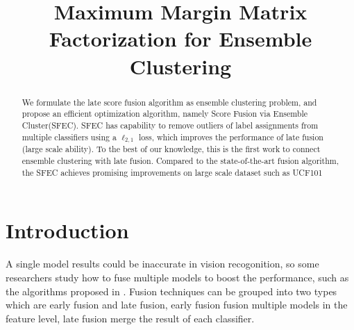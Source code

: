 \documentclass[letterpaper]{article}
\begin{document}
%



\title{Maximum Margin Matrix Factorization for Ensemble Clustering}




\maketitle



\begin{abstract}
We formulate the late score fusion algorithm as ensemble clustering problem, and propose an efficient optimization algorithm, namely Score Fusion via Ensemble Cluster(SFEC). SFEC has capability to remove outliers of label assignments from multiple classifiers using a $\ell_{2,1}$ loss, which improves the performance of late fusion (large scale ability). To the best of our knowledge, this is the first work to connect ensemble clustering with late fusion. Compared to the state-of-the-art fusion algorithm, the SFEC achieves promising improvements on large scale dataset such as UCF101
\end{abstract}



\section{Introduction}

A single model results could be inaccurate in vision recogonition, so some researchers study how to fuse multiple models to boost the performance, such as the algorithms proposed in \cite{gehler2009feature,xuiccv2013feature,Rakotomamonjy2008Simplemkl}. Fusion techniques can be grouped into two types which are early fusion and late fusion, early fusion fusion multiple models in the feature level, late fusion merge the result of each classifier. 
\end{document}
